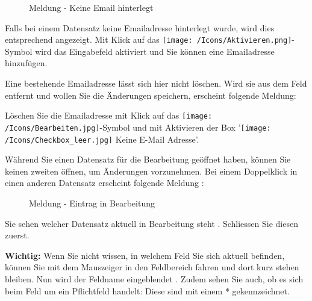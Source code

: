 \begin{figure}[H]
\caption{Meldung - Keine Email hinterlegt}
\end{figure}

Falls bei einem Datensatz keine Emailadresse hinterlegt wurde, wird dies entsprechend angezeigt. Mit Klick auf das \texttt{[image: /Icons/Aktivieren.png]}-Symbol  wird das Eingabefeld aktiviert und Sie können eine Emailadresse hinzufügen.

\vspace{\baselineskip}

Eine bestehende Emailadresse lässt sich hier nicht löschen. Wird sie aus dem Feld entfernt und wollen Sie die Änderungen speichern, erscheint folgende Meldung:

\begin{figure}[H]
\end{figure}
Löschen Sie die Emailadresse mit Klick auf das \texttt{[image: /Icons/Bearbeiten.jpg]}-Symbol und mit Aktivieren der Box '\texttt{[image: /Icons/Checkbox\_leer.jpg]} Keine E-Mail Adresse'.

\vspace{\baselineskip}

Während Sie einen Datensatz für die Bearbeitung geöffnet haben, können Sie keinen zweiten öffnen, um Änderungen vorzunehmen. Bei einem Doppelklick in einen anderen Datensatz erscheint folgende Meldung :

\begin{figure}[H]
\caption{Meldung - Eintrag in Bearbeitung}
\end{figure}

Sie sehen welcher Datensatz aktuell in Bearbeitung steht . Schliessen Sie diesen zuerst.

\textbf{Wichtig:} Wenn Sie nicht wissen, in welchem Feld Sie sich aktuell befinden, können Sie mit dem Mauszeiger in den Feldbereich fahren und dort kurz stehen bleiben. Nun wird der Feldname eingeblendet . Zudem sehen Sie auch, ob es sich beim Feld um ein Pflichtfeld handelt: Diese sind mit einem * gekennzeichnet. 
